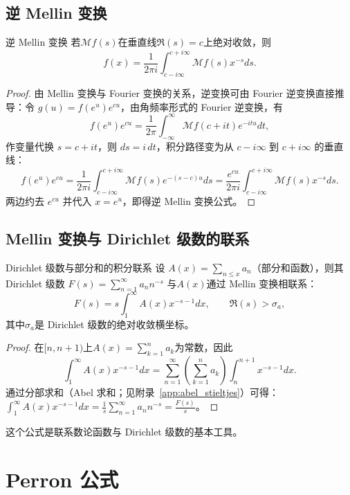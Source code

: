 \subsection{逆 Mellin 变换}

\begin{theorem}{逆 Mellin 变换}{}
若$\mathcal{M}f(s)$在垂直线$\Re(s)=c$上绝对收敛，则
\[
f(x) = \frac{1}{2\pi i} \int_{c-i\infty}^{c+i\infty} \mathcal{M}f(s) x^{-s} ds.
\]
\end{theorem}

\begin{proof}
由 Mellin 变换与 Fourier 变换的关系，逆变换可由 Fourier 逆变换直接推导：令 $g(u) = f(e^u) e^{cu}$，由角频率形式的 Fourier 逆变换，有
\[
f(e^{u})e^{cu} = \frac{1}{2\pi} \int_{-\infty}^{\infty} \mathcal{M}f(c+it) e^{-i t u} dt,
\]
作变量代换 $s = c + it$，则 $ds = i\,dt$，积分路径变为从 $c-i\infty$ 到 $c+i\infty$ 的垂直线：
\[
f(e^u) e^{cu} = \frac{1}{2\pi i} \int_{c-i\infty}^{c+i\infty} \mathcal{M}f(s) e^{-(s-c)u} ds = \frac{e^{cu}}{2\pi i} \int_{c-i\infty}^{c+i\infty} \mathcal{M}f(s) x^{-s} ds.
\]
两边约去 $e^{cu}$ 并代入 $x = e^u$，即得逆 Mellin 变换公式。
\end{proof}

\subsection{Mellin 变换与 Dirichlet 级数的联系}

\begin{theorem}{Dirichlet 级数与部分和的积分联系}{}
设 $A(x) = \sum_{n \le x} a_n$（部分和函数），则其 Dirichlet 级数 $F(s) = \sum_{n=1}^{\infty} a_n n^{-s}$
与$A(x)$通过 Mellin 变换相联系：
\[
F(s) = s \int_1^{\infty} A(x) x^{-s-1} dx, \qquad \Re(s) > \sigma_a,
\]
其中$\sigma_a$是 Dirichlet 级数的绝对收敛横坐标。
\end{theorem}

\begin{proof}
在$[n, n+1)$上$A(x) = \sum_{k=1}^n a_k$为常数，因此
\[
\int_1^{\infty} A(x) x^{-s-1} dx = \sum_{n=1}^{\infty} \left( \sum_{k=1}^n a_k \right) \int_n^{n+1} x^{-s-1} dx.
\]
通过分部求和（Abel 求和；见附录~\ref{app:abel_stieltjes}）可得：
$\int_1^{\infty} A(x) x^{-s-1} dx = \frac{1}{s} \sum_{n=1}^{\infty} a_n n^{-s} = \frac{F(s)}{s}$。
\end{proof}

这个公式是联系数论函数与 Dirichlet 级数的基本工具。

\section{Perron 公式}\label{sec:perron}

